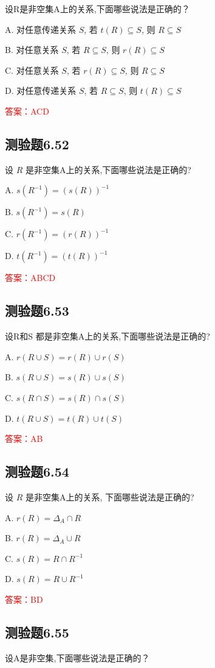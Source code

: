 \documentclass[UTF8, heading=true]{ctexart}
\begin{document}
设R是非空集A上的关系,下面哪些说法是正确的？

A. 对任意传递关系 $S$, 若 $t(R) \subseteq S$, 则 $R \subseteq S$

B. 对任意关系 $S$, 若 $R \subseteq S$, 则 $r(R) \subseteq S$

C. 对任意关系 $S$, 若 $r(R) \subseteq S$, 则 $R \subseteq S$

D. 对任意传递关系 $S$, 若 $R \subseteq S$, 则 $t(R) \subseteq S$

\textcolor{red}{答案：ACD}

\subsection{测验题6.52}

设 $R$ 是非空集A上的关系,下面哪些说法是正确的?

A. $s\left(R^{-1}\right)=(s(R))^{-1}$

B. $s\left(R^{-1}\right)=s(R)$

C. $r\left(R^{-1}\right)=(r(R))^{-1}$

D. $t\left(R^{-1}\right)=(t(R))^{-1}$

\textcolor{red}{答案：ABCD}


\subsection{测验题6.53}
设R和S 都是非空集A上的关系,下面哪些说法是正确的?

A. $r(R \cup S)=r(R) \cup r(S)$

B. $s(R \cup S)=s(R) \cup s(S)$

C. $s(R \cap S)=s(R) \cap s(S)$

D. $t(R \cup S)=t(R) \cup t(S)$

\textcolor{red}{答案：AB}


\subsection{测验题6.54}
设 $R$ 是非空集A上的关系, 下面哪些说法是正确的?

A. $r(R)=\Delta_A \cap R$

B. $r(R)=\Delta_A \cup R$

C. $s(R)=R \cap R^{-1}$

D. $s(R)=R \cup R^{-1}$

\textcolor{red}{答案：BD}

\subsection{测验题6.55}
设A是非空集,下面哪些说法是正确的？
\end{document}
